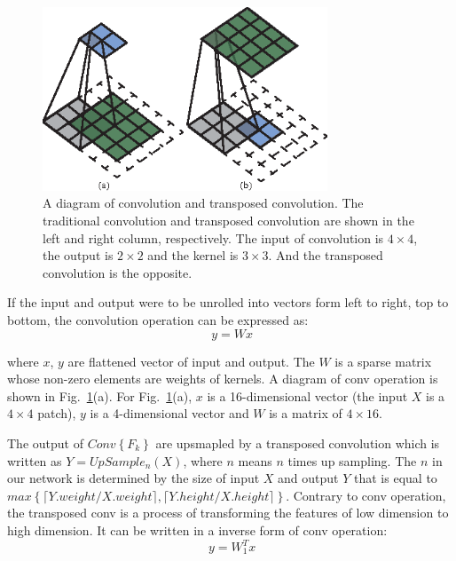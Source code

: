 \begin{figure}
\vspace{-0.4cm}
\setlength{\abovecaptionskip}{-0cm}
\setlength{\belowcaptionskip}{-2cm} 
\centering
\includegraphics[width=8.5cm]{Figures/Conv_Deconv.eps}
\caption{A diagram of convolution and transposed convolution. The traditional convolution and transposed convolution are shown in the left and right column, respectively.
 The input of convolution is ${4\times4}$, the output is ${2\times2}$ and the kernel is ${3\times3}$. And the transposed convolution is the opposite.}
\label{fig:Deconv}
\end{figure}

If the input and output were to be unrolled into vectors form left to right, top to bottom, the convolution operation can be expressed as:
 \begin{equation}
    \label{Conv_matrix}
    \ y = Wx
\end{equation}

where ${x}$, ${y}$ are flattened vector of input and output. The ${W}$ is a sparse matrix whose non-zero elements are weights of kernels.
A diagram of conv operation is shown in Fig.~\ref{fig:Deconv}(a).
For Fig.~\ref{fig:Deconv}(a), ${x}$ is a 16-dimensional vector (the input ${X}$ is a ${4\times4}$ patch), ${y}$ is a 4-dimensional vector and ${W}$ is a matrix of ${4\times16}$.


The output of ${Conv\left\{F_{k}\right\}}$ are upsmapled by a transposed convolution which is written as ${Y = UpSample_n(X)}$, where ${n}$ means ${n}$ times up sampling. The ${n}$ in our network is determined by the size of input $X$ and output $Y$ that is equal to ${max\left\{\lceil Y.weight/X.weight\rceil , \lceil Y.height/X.height\rceil \right\}}$. Contrary to conv operation, the transposed conv is a process of transforming the features of low dimension to high dimension. It can be written in a inverse form of conv operation:
\begin{equation}
    \label{Conv_matrix}
    \ y = W_1^Tx
\end{equation}

